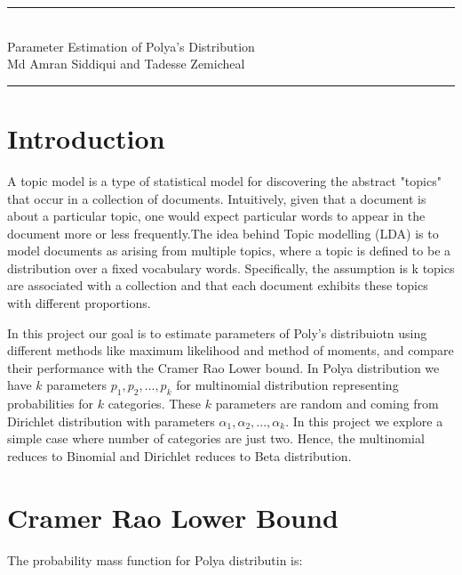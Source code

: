 \documentclass{article} %
\newcommand{\?}{\stackrel{?}{=}}
\newcommand{\horrule}[1]{\rule{\linewidth}{#1}} %
\begin{document}
\begin{center}
\horrule{0.5pt} \\[0.4cm] %
\LARGE Parameter Estimation of Polya's Distribution\\
\vspace{5pt}
\large Md Amran Siddiqui \normalsize and \large Tadesse Zemicheal\\
\vspace{5pt}
\horrule{2pt} %
\end{center}



\section{Introduction} \label{INTRO}
A topic model is a type of statistical model for discovering the abstract "topics" that occur in a collection of documents. Intuitively, given that a document is about a particular topic, one would expect particular words to appear in the document more or less frequently.The idea behind Topic modelling (LDA) is to model documents as arising from multiple topics, where a topic is defined to be a distribution over a fixed vocabulary words. Specifically, the assumption is k topics are associated with a collection and that each document exhibits these topics with different proportions.

In this project our goal is to estimate parameters of Poly's distribuiotn using different methods like maximum likelihood and method of moments, and compare their performance with the Cramer Rao Lower bound. In Polya distribution we have $k$ parameters $p_1, p_2, ..., p_k$ for multinomial distribution representing probabilities for $k$ categories. These $k$ parameters are random and coming from Dirichlet distribution with parameters $\alpha_1, \alpha_2, ..., \alpha_k$. In this project we explore a simple case where number of categories are just two. Hence, the multinomial reduces to Binomial and Dirichlet reduces to Beta distribution.

\section{Cramer Rao Lower Bound}\label{CRLB}
The probability mass function for Polya distributin is:
\end{document}
